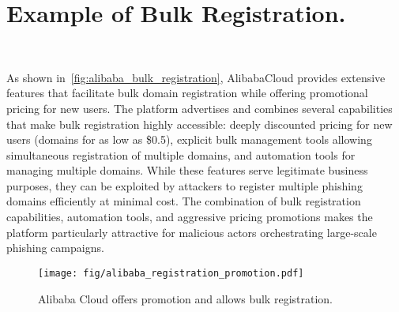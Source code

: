 \newpage

\section{Example of Bulk Registration.}~\label{apx:bulk_registration}

As shown in~\autoref{fig:alibaba_bulk_registration}, AlibabaCloud provides extensive features that facilitate bulk domain registration while offering promotional pricing for new users. The platform advertises and combines several capabilities that make bulk registration highly accessible: deeply discounted pricing for new users (domains for as low as \$0.5), explicit bulk management tools allowing simultaneous registration of multiple domains, and automation tools for managing multiple domains. While these features serve legitimate business purposes, they can be exploited by attackers to register multiple phishing domains efficiently at minimal cost. The combination of bulk registration capabilities, automation tools, and aggressive pricing promotions makes the platform particularly attractive for malicious actors orchestrating large-scale phishing campaigns.

\begin{figure}[h]
    \centering
    \texttt{[image: fig/alibaba\_registration\_promotion.pdf]}
    \caption{Alibaba Cloud offers promotion and allows bulk registration.}
    \label{fig:alibaba_bulk_registration}
\end{figure}
